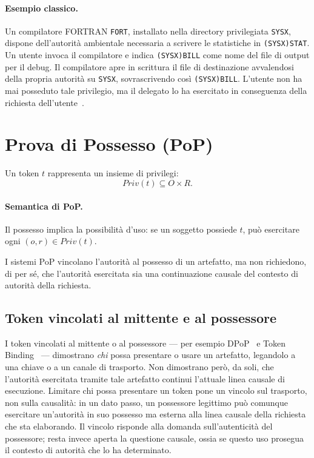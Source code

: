 \documentclass[11pt]{article}
\begin{document}
\paragraph{Esempio classico.}
Un compilatore FORTRAN \texttt{FORT}, installato nella directory privilegiata
\texttt{SYSX}, dispone dell'autorità ambientale necessaria a scrivere le
statistiche in \texttt{(SYSX)STAT}. Un utente invoca il compilatore e indica
\texttt{(SYSX)BILL} come nome del file di output per il debug. Il compilatore
apre in scrittura il file di destinazione avvalendosi della propria autorità su
\texttt{SYSX}, sovrascrivendo così \texttt{(SYSX)BILL}. L'utente non ha mai
posseduto tale privilegio, ma il delegato lo ha esercitato in conseguenza della
richiesta dell'utente~\cite{hardy1988confused}.

\section{Prova di Possesso (PoP)}

Un token $t$ rappresenta un insieme di privilegi:
\[
Priv(t) \subseteq O \times R.
\]

\paragraph{Semantica di PoP.}
Il possesso implica la possibilità d'uso: se un soggetto possiede $t$, può
esercitare ogni $(o,r)\in Priv(t)$.

I sistemi PoP vincolano l'autorità al possesso di un artefatto, ma non
richiedono, di per sé, che l'autorità esercitata sia una continuazione causale
del contesto di autorità della richiesta.

\subsection{Token vincolati al mittente e al possessore}

I token vincolati al mittente o al possessore --- per esempio
DPoP~\cite{fett2023dpop} e Token Binding~\cite{popov2018token} --- dimostrano
\emph{chi} possa presentare o usare un artefatto, legandolo a una chiave o a un
canale di trasporto. Non dimostrano però, da soli, che l'autorità esercitata
tramite tale artefatto continui l'attuale linea causale di esecuzione. Limitare
chi possa presentare un token pone un vincolo sul trasporto, non sulla
causalità: in un dato passo, un possessore legittimo può comunque esercitare
un'autorità in suo possesso ma esterna alla linea causale della richiesta che
sta elaborando. Il vincolo risponde alla domanda sull'autenticità del
possessore; resta invece aperta la questione causale, ossia se questo uso
prosegua il contesto di autorità che lo ha determinato.
\end{document}
